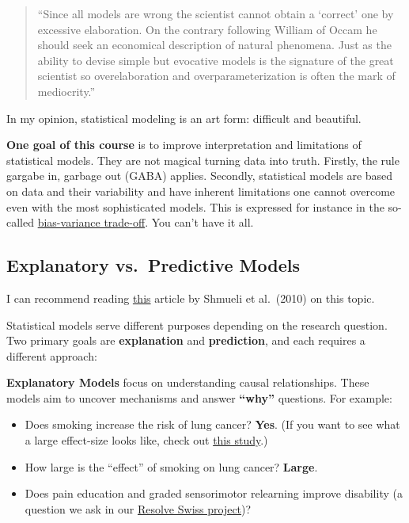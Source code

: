\documentclass[
]{book}
\providecommand{\tightlist}{%
  \setlength{\itemsep}{0pt}\setlength{\parskip}{0pt}}
\begin{document}
\begin{quote}
``Since all models are wrong the scientist cannot obtain
a `correct' one by excessive elaboration. On the contrary
following William of Occam he should seek an economical
description of natural phenomena. Just as the ability to
devise simple but evocative models is the signature of the
great scientist so overelaboration and overparameterization is often the mark of mediocrity.''
\end{quote}

In my opinion, statistical modeling is an art form: difficult and beautiful.

\textbf{One goal of this course} is to improve interpretation and limitations of statistical models.
They are not magical turning data into truth. Firstly, the rule gargabe in, garbage out (GABA) applies.
Secondly, statistical models are based on data and their variability and have inherent limitations
one cannot overcome even with the most sophisticated models. This is expressed for instance
in the so-called \href{https://en.wikipedia.org/wiki/Bias\%E2\%80\%93variance_tradeoff}{bias-variance trade-off}.
You can't have it all.

\subsection{Explanatory vs.~Predictive Models}\label{explanatory-vs.-predictive-models}

I can recommend reading \href{https://projecteuclid.org/journals/statistical-science/volume-25/issue-3/To-Explain-or-to-Predict/10.1214/10-STS330.full}{this}
article by Shmueli et al.~(2010) on this topic.

Statistical models serve different purposes depending on the research question. Two primary goals are \textbf{explanation}
and \textbf{prediction}, and each requires a different approach:

\textbf{Explanatory Models} focus on understanding causal relationships.
These models aim to uncover mechanisms and answer \textbf{``why''}
questions. For example:

\begin{itemize}
\tightlist
\item
  Does smoking increase the risk of lung cancer? \textbf{Yes}. (If you want to see what a large effect-size looks like, check out \href{https://bmjopen.bmj.com/content/bmjopen/8/10/e021611.full.pdf}{this study}.)
\item
  How large is the ``effect'' of smoking on lung cancer? \textbf{Large}.
\item
  Does pain education and graded sensorimotor relearning improve disability (a question we ask in
  our \href{https://data.snf.ch/grants/grant/220585}{Resolve Swiss project})?
\end{itemize}
\end{document}
